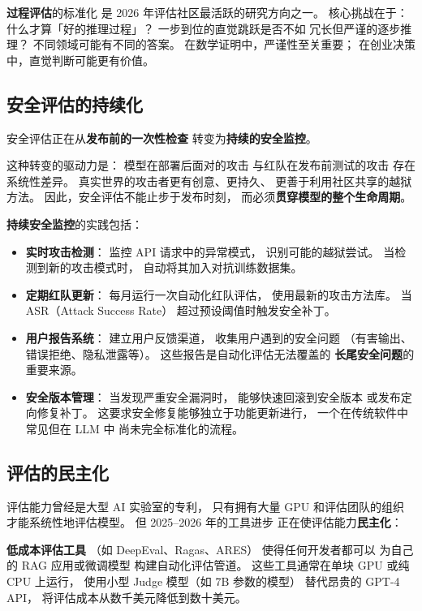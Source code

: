 \textbf{过程评估}的标准化
是 2026 年评估社区最活跃的研究方向之一。
核心挑战在于：
什么才算「好的推理过程」？
一步到位的直觉跳跃是否不如
冗长但严谨的逐步推理？
不同领域可能有不同的答案。
在数学证明中，严谨性至关重要；
在创业决策中，直觉判断可能更有价值。

\subsection{安全评估的持续化}

安全评估正在从\textbf{发布前的一次性检查}
转变为\textbf{持续的安全监控}。

这种转变的驱动力是：
模型在部署后面对的攻击
与红队在发布前测试的攻击
存在系统性差异。
真实世界的攻击者更有创意、更持久、
更善于利用社区共享的越狱方法。
因此，安全评估不能止步于发布时刻，
而必须\textbf{贯穿模型的整个生命周期}。

\textbf{持续安全监控}的实践包括：
\begin{itemize}[noitemsep]
  \item \textbf{实时攻击检测}：
        监控 API 请求中的异常模式，
        识别可能的越狱尝试。
        当检测到新的攻击模式时，
        自动将其加入对抗训练数据集。
  \item \textbf{定期红队更新}：
        每月运行一次自动化红队评估，
        使用最新的攻击方法库。
        当 ASR（Attack Success Rate）
        超过预设阈值时触发安全补丁。
  \item \textbf{用户报告系统}：
        建立用户反馈渠道，
        收集用户遇到的安全问题
        （有害输出、错误拒绝、隐私泄露等）。
        这些报告是自动化评估无法覆盖的
        \textbf{长尾安全问题}的重要来源。
  \item \textbf{安全版本管理}：
        当发现严重安全漏洞时，
        能够快速回滚到安全版本
        或发布定向修复补丁。
        这要求安全修复能够独立于功能更新进行，
        一个在传统软件中常见但在 LLM 中
        尚未完全标准化的流程。
\end{itemize}

\subsection{评估的民主化}

评估能力曾经是大型 AI 实验室的专利，
只有拥有大量 GPU 和评估团队的组织
才能系统性地评估模型。
但 2025--2026 年的工具进步
正在使评估能力\textbf{民主化}：

\textbf{低成本评估工具}
（如 DeepEval、Ragas、ARES）
使得任何开发者都可以
为自己的 RAG 应用或微调模型
构建自动化评估管道。
这些工具通常在单块 GPU 或纯 CPU 上运行，
使用小型 Judge 模型（如 7B 参数的模型）
替代昂贵的 GPT-4 API，
将评估成本从数千美元降低到数十美元。

